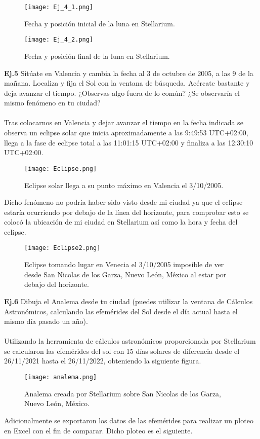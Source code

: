 \documentclass[12pt,letterpaper]{article}
\begin{document}
\begin{figure}[H]
\centering
\texttt{[image: Ej\_4\_1.png]}
\caption{Fecha y posición inicial de la luna en Stellarium.}
\vspace{0.3cm}
\texttt{[image: Ej\_4\_2.png]}
\caption{Fecha y posición final de la luna en Stellarium.}
\end{figure}
\textbf{Ej.5} Sitúate en Valencia y cambia la fecha al 3 de octubre de 2005, a las 9 de la mañana. Localiza y fija el Sol con la ventana de búsqueda. Acércate bastante y deja avanzar el tiempo. ¿Observas algo fuera de lo común? ¿Se observaría el mismo fenómeno en tu ciudad?\\\\
Tras colocarnos en Valencia y dejar avanzar el tiempo en la fecha indicada se observa un eclipse solar que inicia aproximadamente a las 9:49:53 UTC+02:00, llega a la fase de eclipse total a las 11:01:15 UTC+02:00 y finaliza a las 12:30:10 UTC+02:00.
\begin{figure}[H]
\centering
\texttt{[image: Eclipse.png]}
\caption{Eclipse solar llega a su punto máximo en Valencia el 3/10/2005.}
\end{figure}
Dicho fenómeno no podría haber sido visto desde mi ciudad ya que el eclipse estaría ocurriendo por debajo de la línea del horizonte, para comprobar esto se colocó la ubicación de mi ciudad en Stellarium así como la hora y fecha del eclipse.
\begin{figure}[H]
\centering
\texttt{[image: Eclipse2.png]}
\caption{Eclipse tomando lugar en Venecia el 3/10/2005 imposible de ver desde San Nicolas de los Garza, Nuevo León, México al estar por debajo del horizonte.}
\end{figure}
\textbf{Ej.6} Dibuja el Analema desde tu ciudad (puedes utilizar la ventana de Cálculos Astronómicos, calculando las efemérides del Sol desde el día actual hasta el mismo día pasado un año).\\\\
Utilizando la herramienta de cálculos astronómicos proporcionada por Stellarium se calcularon las efemérides del sol con 15 días solares de diferencia desde el 26/11/2021 hasta el 26/11/2022, obteniendo la siguiente figura.
\begin{figure}[H]
\centering
\texttt{[image: analema.png]}
\caption{Analema creada por Stellarium sobre San Nicolas de los Garza, Nuevo León, México.}
\end{figure}
Adicionalmente se exportaron los datos de las efemérides para realizar un ploteo en Excel con el fin de comparar. Dicho ploteo es el siguiente.
\end{document}
